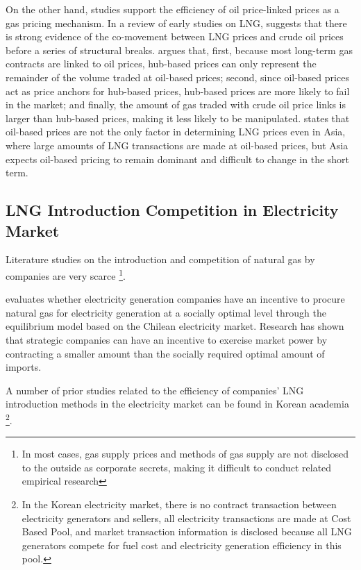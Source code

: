 \documentclass[12pt]{article}
\begin{document}
On the other hand, studies support the efficiency of oil price-linked prices as a gas pricing mechanism. In a review of early studies on LNG, \cite{hupka2023review} suggests that there is strong evidence of the co-movement between LNG prices and crude oil prices before a series of structural breaks. \cite{komlev2016oil} argues that, first, because most long-term gas contracts are linked to oil prices, hub-based prices can only represent the remainder of the volume traded at oil-based prices; second, since oil-based prices act as price anchors for hub-based prices, hub-based prices are more likely to fail in the market; and finally, the amount of gas traded with crude oil price links is larger than hub-based prices, making it less likely to be manipulated.\cite{zhang2018exploring} states that oil-based prices are not the only factor in determining LNG prices even in Asia, where large amounts of LNG transactions are made at oil-based prices, but Asia expects oil-based pricing to remain dominant and difficult to change in the short term.




\subsection{LNG Introduction Competition in Electricity Market}

Literature studies on the introduction and competition of natural gas by companies are very scarce \footnote{In most cases, gas supply prices and methods of gas supply are not disclosed to the outside as corporate secrets, making it difficult to conduct related empirical research}.

\cite{fernandez2020analysis} evaluates whether electricity generation companies have an incentive to procure natural gas for electricity generation at a socially optimal level through the equilibrium model based on the Chilean electricity market. Research has shown that strategic companies can have an incentive to exercise market power by contracting a smaller amount than the socially required optimal amount of imports.


A number of prior studies related to the efficiency of companies' LNG introduction methods in the electricity market can be found in Korean academia \footnote{In the Korean electricity market, there is no contract transaction between electricity generators and sellers, all electricity transactions are made at Cost Based Pool, and market transaction information is disclosed because all LNG generators compete for fuel cost and electricity generation efficiency in this pool.}.
\end{document}
